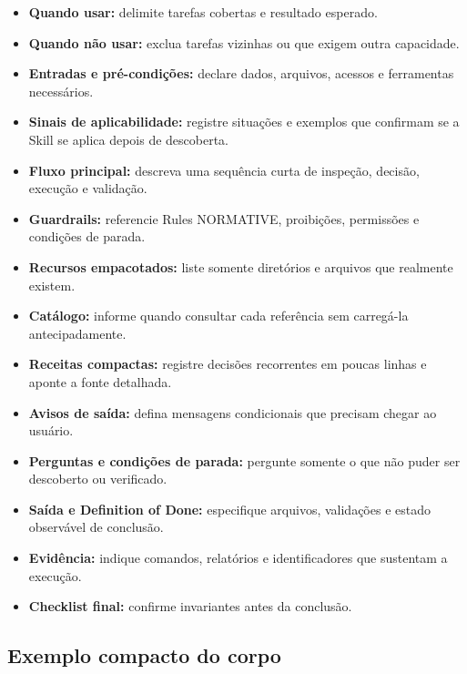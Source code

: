 \documentclass[
  10pt,
  a4paper,
  oneside]{book}
\providecommand{\tightlist}{%
  \setlength{\itemsep}{0pt}\setlength{\parskip}{0pt}}
\begin{document}
\begin{itemize}
\tightlist
\item
  \textbf{Quando usar:} delimite tarefas cobertas e resultado esperado.
\item
  \textbf{Quando não usar:} exclua tarefas vizinhas ou que exigem outra
  capacidade.
\item
  \textbf{Entradas e pré-condições:} declare dados, arquivos, acessos e
  ferramentas necessários.
\item
  \textbf{Sinais de aplicabilidade:} registre situações e exemplos que
  confirmam se a Skill se aplica depois de descoberta.
\item
  \textbf{Fluxo principal:} descreva uma sequência curta de inspeção,
  decisão, execução e validação.
\item
  \textbf{Guardrails:} referencie Rules NORMATIVE, proibições,
  permissões e condições de parada.
\item
  \textbf{Recursos empacotados:} liste somente diretórios e arquivos que
  realmente existem.
\item
  \textbf{Catálogo:} informe quando consultar cada referência sem
  carregá-la antecipadamente.
\item
  \textbf{Receitas compactas:} registre decisões recorrentes em poucas
  linhas e aponte a fonte detalhada.
\item
  \textbf{Avisos de saída:} defina mensagens condicionais que precisam
  chegar ao usuário.
\item
  \textbf{Perguntas e condições de parada:} pergunte somente o que não
  puder ser descoberto ou verificado.
\item
  \textbf{Saída e Definition of Done:} especifique arquivos, validações
  e estado observável de conclusão.
\item
  \textbf{Evidência:} indique comandos, relatórios e identificadores que
  sustentam a execução.
\item
  \textbf{Checklist final:} confirme invariantes antes da conclusão.
\end{itemize}

\hypertarget{exemplo-compacto-do-corpo}{%
\subsection{Exemplo compacto do corpo}\label{exemplo-compacto-do-corpo}}
\end{document}
